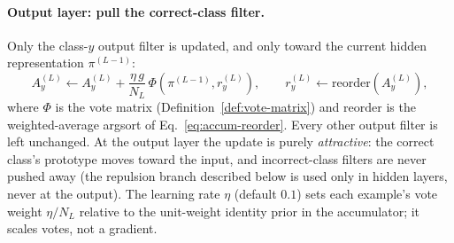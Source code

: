 \documentclass[12pt]{article}
\begin{document}
\paragraph{Output layer: pull the correct-class filter.}
Only the class-$y$ output filter is updated, and only toward the current hidden representation $\pi^{(L-1)}$:
\begin{equation}
\label{eq:output-update}
A^{(L)}_y \leftarrow A^{(L)}_y + \frac{\eta\, g}{N_L}\,\Phi\!\left(\pi^{(L-1)}, r^{(L)}_y\right), \qquad r^{(L)}_y \leftarrow \mathrm{reorder}\!\left(A^{(L)}_y\right),
\end{equation}
where $\Phi$ is the vote matrix (Definition~\ref{def:vote-matrix}) and $\mathrm{reorder}$ is the weighted-average argsort of Eq.~\eqref{eq:accum-reorder}. Every other output filter is left unchanged. At the output layer the update is purely \emph{attractive}: the correct class's prototype moves toward the input, and incorrect-class filters are never pushed away (the repulsion branch described below is used only in hidden layers, never at the output). The learning rate $\eta$ (default $0.1$) sets each example's vote weight $\eta/N_L$ relative to the unit-weight identity prior in the accumulator; it scales votes, not a gradient.
\end{document}
